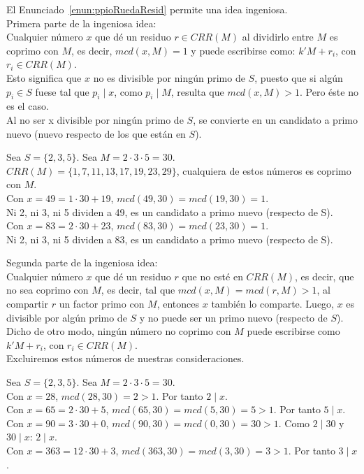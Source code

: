El Enunciado~\ref{enun:ppioRuedaResid} permite una idea ingeniosa. \\

Primera parte de la ingeniosa idea: \\
Cualquier número $x$ que dé un residuo $r \in CRR(M)$ al dividirlo entre $M$ es coprimo con $M$, es decir, $mcd(x,M)=1$ y puede escribirse como:  $k'M + r_i$, con $r_i \in CRR(M)$. \\
Esto significa que $x$ no es divisible por ningún primo de $S$, puesto que si algún $p_i \in S$ fuese tal que $p_i \mid x$, como $p_i \mid M$, resulta que $mcd(x,M) > 1$. Pero éste no es el caso. \\
Al no ser x divisible por ningún primo de $S$, se convierte en un candidato a primo nuevo (nuevo respecto de los que están en $S$).

\begin{ejemplo}
Sea $S = \{2,3,5\}$. Sea $M=2 \cdot 3 \cdot 5 = 30$.\\
$CRR(M)=\{1, 7, 11, 13, 17, 19, 23, 29\}$, cualquiera de estos números es coprimo con $M$.\\
Con $x=49=1 \cdot 30 + 19$, $mcd(49,30)=mcd(19,30)=1$.\\
Ni 2, ni 3, ni 5 dividen a 49, es un candidato a primo nuevo (respecto de S). \\
Con $x=83=2 \cdot 30 + 23$, $mcd(83,30)=mcd(23,30)=1$.\\
Ni 2, ni 3, ni 5 dividen a 83, es un candidato a primo nuevo (respecto de S).
\end{ejemplo}

Segunda parte de la ingeniosa idea: \\
Cualquier número $x$ que dé un residuo $r$ que no esté en $CRR(M)$, es decir, que no sea coprimo con $M$, es decir, tal que $mcd(x,M)=mcd(r,M)>1$, al compartir $r$ un factor primo con $M$, entonces $x$ también lo comparte. Luego, $x$ es divisible por algún primo de $S$ y no puede ser un primo nuevo (respecto de $S$). \\
Dicho de otro modo, ningún número no coprimo con $M$ puede escribirse como  $k'M + r_i$, con $r_i \in CRR(M)$.\\
Excluiremos estos números de nuestras consideraciones.

\begin{ejemplo}
Sea $S = \{2,3,5\}$. Sea $M=2 \cdot 3 \cdot 5 = 30$.\\
Con $x=28$, $mcd(28,30)=2 > 1$. Por tanto $2 \mid x$. \\
Con $x=65=2 \cdot 30 + 5$, $mcd(65,30)=mcd(5,30)=5 > 1$. Por tanto $5 \mid x$. \\
Con $x=90=3 \cdot 30 + 0$, $mcd(90,30)=mcd(0,30)=30 > 1$. Como $2 \mid 30$ y $30 \mid x$: $2 \mid x$. \\
Con $x=363=12 \cdot 30 + 3$, $mcd(363,30)=mcd(3,30)=3 > 1$. Por tanto $3 \mid x$. 
\end{ejemplo}

